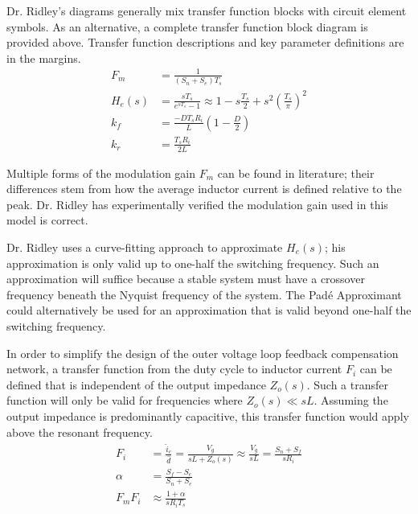 \documentclass{tufte-handout}
\begin{document}

Dr. Ridley's diagrams generally mix transfer function blocks with circuit element symbols.
As an alternative, a complete transfer function block diagram is provided above.
Transfer function descriptions and key parameter definitions are in the margins.
\begin{align*}
F_m&=\frac{1}{(S_n+S_e)T_s}\\[0.75em]
H_e(s)&=\frac{sT_s}{e^{sT_s}-1}\approx1-s\frac{T_s}{2}+s^2\left(\frac{T_s}{\pi}\right)^2\\[0.75em]
k_f&=\frac{-DT_sR_i}{L}\left(1-\frac{D}{2}\right)\\[0.75em]
k_r&=\frac{T_sR_i}{2L}
\end{align*}

Multiple forms of the modulation gain $F_m$ can be found in literature; their differences stem from how the average inductor current is defined relative to the peak.
Dr. Ridley has experimentally verified the modulation gain used in this model is correct.

Dr. Ridley uses a curve-fitting approach to approximate $H_e(s)$; his approximation is only valid up to one-half the switching frequency.
Such an approximation will suffice because a stable system must have a crossover frequency beneath the Nyquist frequency of the system.
The Pad\'e Approximant could alternatively be used for an approximation that is valid beyond one-half the switching frequency.

In order to simplify the design of the outer voltage loop feedback compensation network, a transfer function from the duty cycle to inductor current $F_i$ can be defined that is independent of the output impedance $Z_o(s)$.
Such a transfer function will only be valid for frequencies where $Z_o(s) \ll sL$. Assuming the output impedance is predominantly capacitive, this transfer function would apply above the resonant frequency.
\begin{align*}
F_i&=\frac{\widehat{i}_c}{\widehat{d}}=\frac{V_g}{sL+Z_o(s)}\approx\frac{V_g}{sL}=\frac{S_n+S_f}{sR_i}\\[0.75em]
\alpha&=\frac{S_f-S_e}{S_n+S_e}\\[0.75em]
F_mF_i&\approx\frac{1+\alpha}{sR_iT_s}
\end{align*}
\end{document}
